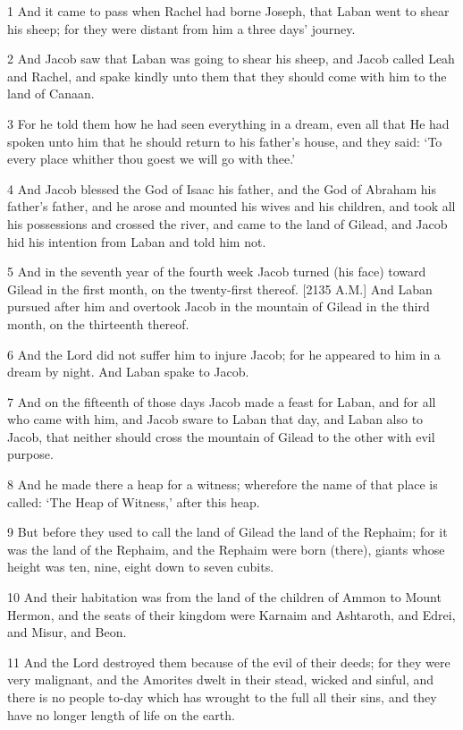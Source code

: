 \par 1 And it came to pass when Rachel had borne Joseph, that Laban went to shear his sheep; for they were distant from him a three days' journey.
\par 2 And Jacob saw that Laban was going to shear his sheep, and Jacob called Leah and Rachel, and spake kindly unto them that they should come with him to the land of Canaan.
\par 3 For he told them how he had seen everything in a dream, even all that He had spoken unto him that he should return to his father's house, and they said: ‘To every place whither thou goest we will go with thee.’
\par 4 And Jacob blessed the God of Isaac his father, and the God of Abraham his father's father, and he arose and mounted his wives and his children, and took all his possessions and crossed the river, and came to the land of Gilead, and Jacob hid his intention from Laban and told him not.
\par 5 And in the seventh year of the fourth week Jacob turned (his face) toward Gilead in the first month, on the twenty-first thereof. [2135 A.M.] And Laban pursued after him and overtook Jacob in the mountain of Gilead in the third month, on the thirteenth thereof.
\par 6 And the Lord did not suffer him to injure Jacob; for he appeared to him in a dream by night. And Laban spake to Jacob.
\par 7 And on the fifteenth of those days Jacob made a feast for Laban, and for all who came with him, and Jacob sware to Laban that day, and Laban also to Jacob, that neither should cross the mountain of Gilead to the other with evil purpose.
\par 8 And he made there a heap for a witness; wherefore the name of that place is called: ‘The Heap of Witness,’ after this heap.
\par 9 But before they used to call the land of Gilead the land of the Rephaim; for it was the land of the Rephaim, and the Rephaim were born (there), giants whose height was ten, nine, eight down to seven cubits.
\par 10 And their habitation was from the land of the children of Ammon to Mount Hermon, and the seats of their kingdom were Karnaim and Ashtaroth, and Edrei, and Misur, and Beon.
\par 11 And the Lord destroyed them because of the evil of their deeds; for they were very malignant, and the Amorites dwelt in their stead, wicked and sinful, and there is no people to-day which has wrought to the full all their sins, and they have no longer length of life on the earth.
